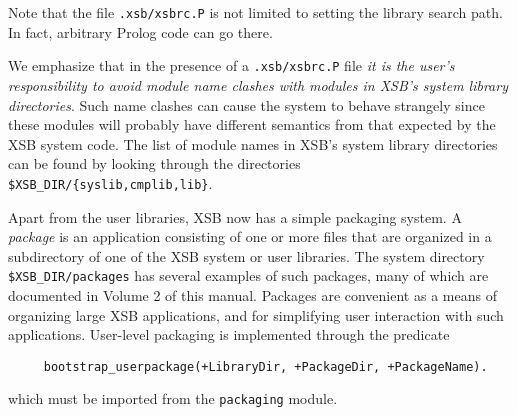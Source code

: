Note that the file {\verb|.xsb/xsbrc.P|} is not limited to setting the
library search path.  In fact, arbitrary Prolog code can go there.

We emphasize that in the presence of a {\verb|.xsb/xsbrc.P|} file {\em
it is the user's responsibility to avoid module name clashes with
modules in XSB's system library directories}.  Such name clashes can
cause the system to behave strangely since these modules will probably
have different semantics from that expected by the XSB system code.
The list of module names in XSB's system library directories can be
found by looking through the directories {\tt
\$XSB\_DIR/\{syslib,cmplib,lib\}}.

Apart from the user libraries, XSB now has a simple packaging system.
A {\em package\/} is an application consisting of one or more files that
are organized in a subdirectory of one of the XSB system or user libraries.
The system directory \verb|$XSB_DIR/packages| has several examples
of such packages, many of which are documented in Volume 2 of this
manual.  Packages are convenient as a means of organizing large XSB
applications, and for simplifying user interaction with such
applications.  User-level packaging is implemented through the
predicate
\begin{verbatim}
     bootstrap_userpackage(+LibraryDir, +PackageDir, +PackageName).
\end{verbatim}
which must be imported from the {\tt packaging} module. 

